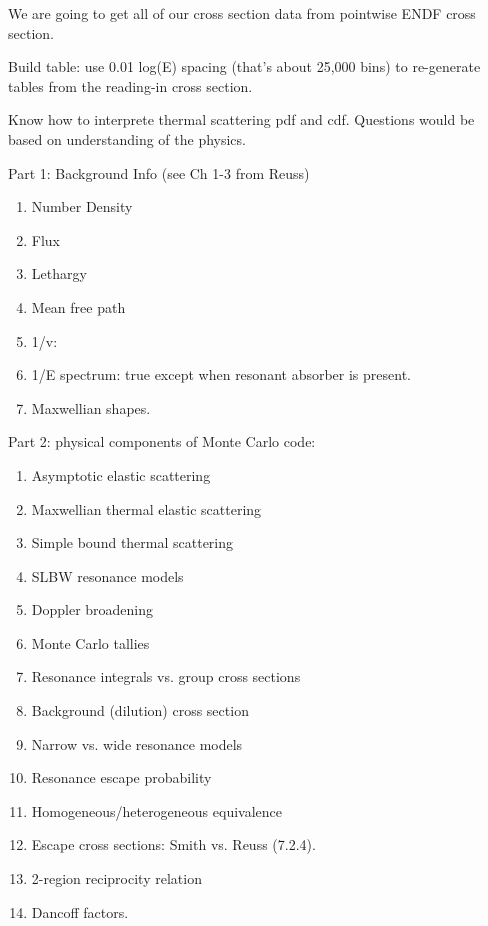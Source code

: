 \documentclass{school-22.211-notes}
\begin{document}
We are going to get all of our cross section data from pointwise ENDF cross section. 

Build table: use 0.01 log(E) spacing (that's about 25,000 bins) to re-generate tables from the reading-in cross section. 


Know how to interprete thermal scattering pdf and cdf. Questions would be based on understanding of the physics. 

Part 1: Background Info (see Ch 1-3 from Reuss)
\begin{enumerate}
\item Number Density
\item Flux
\item Lethargy
\item Mean free path
\item 1/v:
\item 1/E spectrum: true except when resonant absorber is present. 
\item Maxwellian shapes.
\end{enumerate}


Part 2: physical components of Monte Carlo code:
\begin{enumerate}
\item Asymptotic elastic scattering
\item Maxwellian thermal elastic scattering
\item Simple bound thermal scattering
\item SLBW resonance models
\item Doppler broadening
\item Monte Carlo tallies
\item Resonance integrals vs. group cross sections
\item Background (dilution) cross section
\item Narrow vs. wide resonance models
\item Resonance escape probability
\item Homogeneous/heterogeneous equivalence
\item Escape cross sections: Smith vs. Reuss (7.2.4). 
\item 2-region reciprocity relation
\item Dancoff factors.
\end{enumerate}
\end{document}
